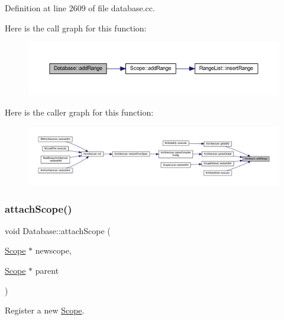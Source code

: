 Definition at line 2609 of file database.\+cc.

Here is the call graph for this function\+:
\nopagebreak
\begin{figure}[H]
\begin{center}
\leavevmode
\includegraphics[width=350pt]{class_database_a3ad165aa6ec64f417376669625d31c69_cgraph}
\end{center}
\end{figure}
Here is the caller graph for this function\+:
\nopagebreak
\begin{figure}[H]
\begin{center}
\leavevmode
\includegraphics[width=350pt]{class_database_a3ad165aa6ec64f417376669625d31c69_icgraph}
\end{center}
\end{figure}
\mbox{\label{class_database_a1bc096166a8cfde3d77229c9e38bfabf}} 
\subsubsection{\texorpdfstring{attachScope()}{attachScope()}}
{\footnotesize\ttfamily void Database\+::attach\+Scope (\begin{DoxyParamCaption}\item[{\mbox{\hyperlink{class_scope}{Scope}} $\ast$}]{newscope,  }\item[{\mbox{\hyperlink{class_scope}{Scope}} $\ast$}]{parent }\end{DoxyParamCaption})}



Register a new \mbox{\hyperlink{class_scope}{Scope}}. 


